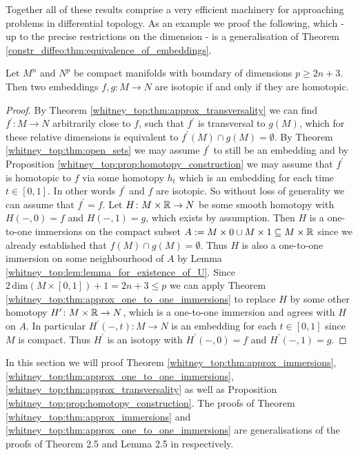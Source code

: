 Together all of these results comprise a very efficient machinery for approaching problems in differential topology. As an example we proof the following, which - up to the precise restrictions on the dimension - is a generalisation of Theorem \ref{constr_diffeo:thm:equivalence_of_embeddings}.

\begin{corollary}
    Let $M^n$ and $N^p$ be compact manifolds with boundary of dimensions $p \geq 2n+3$. Then two embeddings $f,g \colon M \to N$ are isotopic if and only if they are homotopic.
\end{corollary}

\begin{proof}
    By Theorem \ref{whitney_top:thm:approx_transversality} we can find $f^\prime \colon M \to N$ arbitrarily close to $f$, such that $f^\prime$ is transversal to $g(M)$, which for these relative dimensions is equivalent to $f^\prime(M) \cap g(M) = \emptyset$. By Theorem \ref{whitney_top:thm:open_sets} we may assume $f^\prime$ to still be an embedding and by Proposition \ref{whitney_top:prop:homotopy_construction} we may assume that $f^\prime$ is homotopic to $f$ via some homotopy $h_t$ which is an embedding for each time $t \in [0,1]$. In other words $f^\prime$ and $f$ are isotopic. So without loss of generality we can assume that $f^\prime = f$. Let $H \colon M \times \mathbb{R} \to N$ be some smooth homotopy with $H(-,0) = f$ and $H(-,1) = g$, which exists by assumption. Then $H$ is a one-to-one immersions on the compact subset $A := M \times 0 \cup M \times 1 \subseteq M \times \mathbb{R}$ since we already established that $f(M) \cap g(M) = \emptyset$. Thus $H$ is also a one-to-one immersion on some neighbourhood of $A$ by Lemma \ref{whitney_top:lem:lemma_for_existence_of_U}. Since $2 \,\mathrm{dim}(M \times [0,1]) +1 = 2n+3 \leq p$ we can apply Theorem \ref{whitney_top:thm:approx_one_to_one_immersions} to replace $H$ by some other homotopy $H^\prime \colon M \times \mathbb{R} \to N$, which is a one-to-one immersion and agrees with $H$ on $A$. In particular $H^\prime(-,t) \colon M \to N$ is an embedding for each $t \in [0,1]$ since $M$ is compact. Thus $H^\prime$ is an isotopy with $H^\prime(-,0) = f$ and $H^\prime(-,1) = g$.
\end{proof}


In this section we will proof Theorem \ref{whitney_top:thm:approx_immersions}, \ref{whitney_top:thm:approx_one_to_one_immersions}, \ref{whitney_top:thm:approx_transversality} as well as Proposition \ref{whitney_top:prop:homotopy_construction}. The proofs of Theorem \ref{whitney_top:thm:approx_immersions} and \ref{whitney_top:thm:approx_one_to_one_immersions} are generalisations of the proofs of Theorem 2.5 and Lemma 2.5 in \cite{adachi1993embeddings} respectively. 

